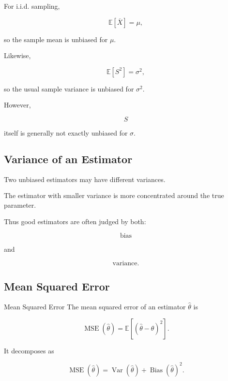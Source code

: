 For i.i.d. sampling,

\[
\boxed{
\mathbb{E}[\overline{X}]
=
\mu,
}
\]

so the sample mean is unbiased for \(\mu\).

Likewise,

\[
\boxed{
\mathbb{E}[S^2]
=
\sigma^2,
}
\]

so the usual sample variance is unbiased for \(\sigma^2\).

However,

\[
S
\]

itself is generally not exactly unbiased for \(\sigma\).

\subsection{Variance of an Estimator}
\label{subsec:variance-estimator}

Two unbiased estimators may have different variances.

The estimator with smaller variance is more concentrated around the true
parameter.

Thus good estimators are often judged by both:

\[
\boxed{
\text{bias}
}
\]

and

\[
\boxed{
\text{variance}.
}
\]

\subsection{Mean Squared Error}
\label{subsec:mean-squared-error}

\begin{definitionbox}{Mean Squared Error}
The mean squared error of an estimator \(\widehat{\theta}\) is

\[
\boxed{
\operatorname{MSE}(\widehat{\theta})
=
\mathbb{E}
\left[
(\widehat{\theta}-\theta)^2
\right].
}
\]
\end{definitionbox}

It decomposes as

\[
\boxed{
\operatorname{MSE}(\widehat{\theta})
=
\operatorname{Var}(\widehat{\theta})
+
\operatorname{Bias}(\widehat{\theta})^2.
}
\]

